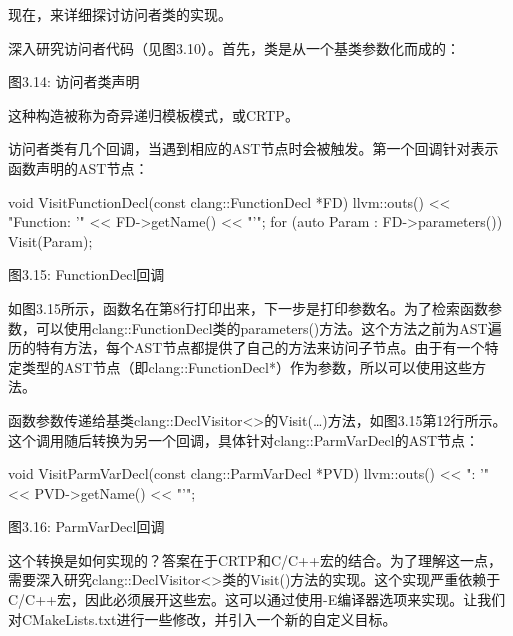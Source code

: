 现在，来详细探讨访问者类的实现。


深入研究访问者代码（见图3.10）。首先，类是从一个基类参数化而成的：

\begin{cpp}
class Visitor : public clang::DeclVisitor<Visitor> {
\end{cpp}

\begin{center}
图3.14: 访问者类声明
\end{center}

这种构造被称为奇异递归模板模式，或CRTP。

访问者类有几个回调，当遇到相应的AST节点时会被触发。第一个回调针对表示函数声明的AST节点：

\begin{cpp}
void VisitFunctionDecl(const clang::FunctionDecl *FD) {
  llvm::outs() << "Function: '" << FD->getName() << "'\n";
  for (auto Param : FD->parameters()) {
    Visit(Param);
  }
}
\end{cpp}

\begin{center}
图3.15: FunctionDecl回调
\end{center}

如图3.15所示，函数名在第8行打印出来，下一步是打印参数名。为了检索函数参数，可以使用clang::FunctionDecl类的parameters()方法。这个方法之前为AST遍历的特有方法，每个AST节点都提供了自己的方法来访问子节点。由于有一个特定类型的AST节点（即clang::FunctionDecl*）作为参数，所以可以使用这些方法。

函数参数传递给基类clang::DeclVisitor<>的Visit(…)方法，如图3.15第12行所示。这个调用随后转换为另一个回调，具体针对clang::ParmVarDecl的AST节点：

\begin{cpp}
void VisitParmVarDecl(const clang::ParmVarDecl *PVD) {
  llvm::outs() << "\tParameter: '" << PVD->getName() << "'\n";
}
\end{cpp}

\begin{center}
图3.16: ParmVarDecl回调
\end{center}

这个转换是如何实现的？答案在于CRTP和C/C++宏的结合。为了理解这一点，需要深入研究clang::DeclVisitor<>类的Visit()方法的实现。这个实现严重依赖于C/C++宏，因此必须展开这些宏。这可以通过使用-E编译器选项来实现。让我们对CMakeLists.txt进行一些修改，并引入一个新的自定义目标。


